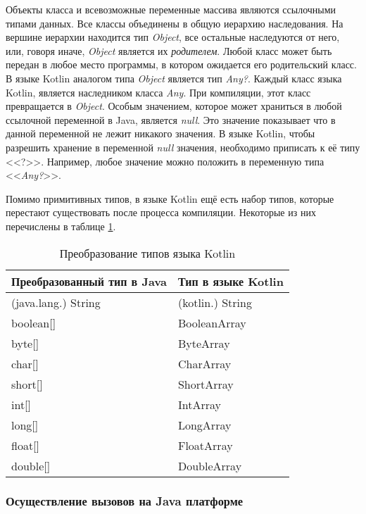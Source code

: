 Объекты класса и всевозможные переменные массива являются ссылочными типами данных. Все классы объединены в общую иерархию наследования. На вершине иерархии находится тип \textit{Object}, все остальные наследуются от него, или, говоря иначе, \textit{Object} является их \textit{родителем}. Любой класс может быть передан в любое место программы, в котором ожидается его родительский класс. В языке Kotlin аналогом типа \textit{Object} является тип \textit{Any?}. Каждый класс языка Kotlin, является наследником класса \textit{Any}. При компиляции, этот класс превращается в \textit{Object}.
Особым значением, которое может храниться в любой ссылочной переменной в Java, является \textit{null}. Это значение показывает что в данной переменной не лежит никакого значения. В языке Kotlin, чтобы разрешить хранение в переменной \textit{null} значения, необходимо приписать к её типу <<?>>. Например, любое значение можно положить в переменную типа <<\textit{Any?}>>.

Помимо примитивных типов, в языке Kotlin ещё есть набор типов, которые перестают существовать после процесса компиляции. Некоторые из них перечислены в таблице \ref{tab:kotlinTypeConversion}.

\begin{table}[h]
\caption{\label{tab:kotlinTypeConversion}Преобразование типов языка Kotlin}
\begin{center}
\begin{tabular}{|l|l|}
\hline
Преобразованный тип в Java & Тип в языке Kotlin \\
\hline
(java.lang.) String & (kotlin.) String \\
boolean[]  & BooleanArray  \\
byte[]  & ByteArray \\
char[]  & CharArray \\
short[]  & ShortArray \\
int[] & IntArray \\
long[] &  LongArray \\
float[] & FloatArray \\
double[] & DoubleArray \\
\hline
\end{tabular}
\end{center}
\end{table}

\subsubsection{Осуществление вызовов на Java платформе}

